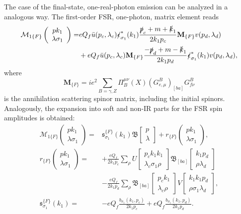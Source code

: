 The case of the final-state, one-real-photon emission can be analyzed in a analogous way. The first-order FSR, one-photon, matrix element reads 
\begin{align}
\mathcal{M}_{1\{F\}}\left(\begin{array}{c}
pk_1\\\lambda\sigma_1
\end{array}\right)
=&eQ_f\bar{u}(p_c,\lambda_c)\slashed \epsilon^\ast_{\sigma_1}(k_1)\frac{\slashed p_c+m+\slashed k_1}{2k_1p_c}\mathbf{M}_{\{F\}}v(p_d,\lambda_d)\nonumber\\
&+eQ_f\bar{u}(p_c,\lambda_c)\mathbf{M}_{\{F\}}\frac{-\slashed p_d+m-\slashed k_1}{2k_1p_d}\slashed \epsilon^\ast_{\sigma_1}(k_1)v(p_d,\lambda_d),\nonumber\\
\end{align}
where
\begin{equation}
\mathbf{M}_{\{F\}}=ie^2\sum_{B=\gamma,Z}\Pi_{B}^{\mu\nu}(X)(G^B_{e,\mu})_{[ba]}G^B_{f\nu}
\end{equation}
is the annihilation scattering spinor matrix, including the initial spinors. Analogously, the expansion into soft and non-IR parts for the FSR spin amplitudes is obtained:
\begin{align}
\mathcal{M}_{1\{F\}}\left(\begin{array}{c}
pk_1\\\lambda\sigma_1
\end{array}\right)=&\mathfrak{s}^{\{F\}}_{\sigma_1}(k_1)\mathfrak{B}\left[\begin{array}{c}
p\\\lambda
\end{array}\right]+r_{\{F\}}\left(\begin{array}{c}
pk_1\\\lambda\sigma_1
\end{array}\right),\nonumber\\
r_{\{F\}}\left(\begin{array}{c}
pk_1\\\lambda\sigma_1
\end{array}\right)=&+\frac{eQ_f}{2k_1p_c}\sum_\rho U\left[\begin{array}{c}
p_ck_1k_1\\\lambda_c\sigma_1\rho
\end{array}\right]\mathfrak{B}_{[ba]}\left[\begin{array}{c}
k_1p_d\\\rho\lambda_d
\end{array}\right]\nonumber\\
&-\frac{eQ_f}{2k_1p_d}\sum_\rho \mathfrak{B}_{[ba]}\left[\begin{array}{c}
p_ck_1\\\lambda_c\rho
\end{array}\right]V\left[\begin{array}{c}
k_1k_1p_d\\\rho\sigma_1\lambda_d
\end{array}\right]
,\nonumber\\
\mathfrak{s}^{\{F\}}_{\sigma_1}(k_1)=&-eQ_f\frac{b_{\sigma_1}(k_1,p_c)}{2k_1p_c}+eQ_f\frac{b_{\sigma_1}(k_1,p_d)}{2k_1p_d}.
\end{align}

